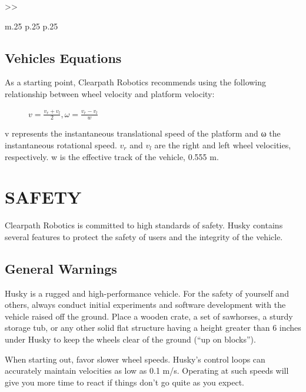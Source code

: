 \documentclass[]{clearpath-latex/clearpath-manual}
\begin{document}
\begin{table}[h]
\begin{tabular}{>{}>{\raggedright}m{.25\textwidth} p{.25\textwidth} p{.25\textwidth}}
	\end{tabular}
\newline
\caption{Husky A200 System Specifications}
\label{systemspecs}
\end{table}

\newpage
\subsection{Vehicles Equations}

As a starting point, Clearpath Robotics recommends using the following relationship between wheel velocity and platform velocity:
\begin{figure}[h]
\centering
$v=\frac{v_r+v_l}{2} , \omega=\frac{v_r-v_l}{w}  $
\end{figure}

v represents the instantaneous translational speed of the platform and ω the instantaneous rotational speed. $v_r$ and $v_l$ are 
the right and left wheel velocities, respectively. w is the effective track of the vehicle, 0.555 m.

\section{SAFETY}
Clearpath Robotics is committed to high standards of safety. Husky contains several features to protect the safety of users and the integrity of the vehicle.

\subsection{General Warnings}

Husky is a rugged and high-performance vehicle. For the safety of yourself and others, 
always conduct initial experiments and software development with the vehicle raised off the ground. 
Place a wooden crate, a set of sawhorses, a sturdy storage tub, or any other solid flat structure having a 
height greater than 6 inches under Husky to keep the wheels clear of the ground (“up on blocks”).

When starting out, favor slower wheel speeds. Husky’s control loops can accurately maintain velocities 
as low as 0.1 m/s. Operating at such speeds will give you more time to react if things don’t go quite as you expect.
\end{document}

